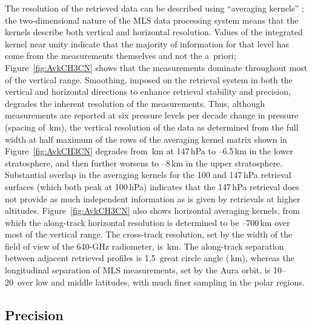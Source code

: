 The resolution of the retrieved data can be described using ``averaging kernels'' \citep[e.g.,][]{Rodgers:2000}; the two-dimensional nature of the MLS data processing system means that the kernels describe both vertical and horizontal resolution. Values of the integrated kernel near unity indicate that the majority of information for that level has come from the measurements themselves and not the a~priori; Figure~\ref{fig:AvkCH3CN} shows that the measurements dominate throughout most of the vertical range. Smoothing, imposed on the retrieval system in both the vertical and horizontal directions to enhance retrieval stability and precision, degrades the inherent resolution of the measurements. Thus, although  measurements are reported at six pressure levels per decade change in pressure (spacing of \,km), the vertical resolution of the \thisv {} data as determined from the full width at half maximum of the rows of the averaging kernel matrix shown in Figure~\ref{fig:AvkCH3CN} degrades from \,km at 147\,hPa to --6.5\,km in the lower stratosphere, and then further worsens to --8\,km in the upper stratosphere. Substantial overlap in the averaging kernels for the 100 and 147\,hPa retrieval surfaces (which both peak at 100\,hPa) indicates that the 147\,hPa retrieval does not provide as much independent information as is given by retrievals at higher altitudes. Figure~\ref{fig:AvkCH3CN} also shows horizontal averaging kernels, from which the along-track horizontal resolution is determined to be --700\,km over most of the vertical range. The cross-track resolution, set by the width of the field of view of the \mbox{640\nobreakdash-GHz} radiometer, is \,km. The along-track separation between adjacent retrieved profiles is 1.5\degsym\ great circle angle (\,km), whereas the longitudinal separation of MLS measurements, set by the Aura orbit, is 10\degsym--20\degsym\ over low and middle latitudes, with much finer sampling in the polar regions.

\subsection{Precision}

